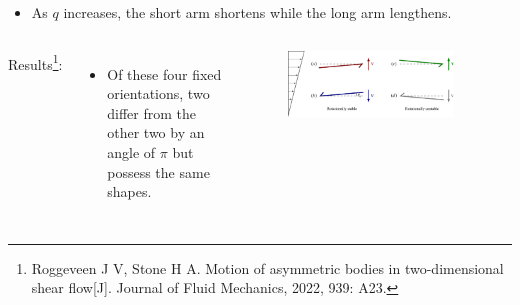 \documentclass{beamer}
\newcommand{\bi}{\begin{itemize}}
\newcommand{\ei}{\end{itemize}}
\begin{document}
\begin{frame}
\begin{overlayarea}{\textwidth}{\textheight}
		\vspace{0.1cm} \small
		\bi
		\item As $q$ increases, the short arm shortens while the long arm lengthens.
		\ei \vspace{0.1cm}
		\begin{columns}
			Results\footnote{\tiny Roggeveen J V, Stone H A. Motion of asymmetric bodies in two-dimensional shear flow[J]. Journal of Fluid Mechanics, 2022, 939: A23.}:
			\bi
			\item Of these four fixed orientations, two differ from the other two by an angle of $\pi$ but possess the same shapes.
			\ei \vspace{0.2cm}
			\vspace{-0.5cm}
			\begin{figure}[htb]
				\begin{center}
					\includegraphics[width=0.9\textwidth]{plots/stone3.png}
				\end{center}
			\end{figure}
		\end{columns}
	\end{overlayarea}
\end{frame}

\end{document}

